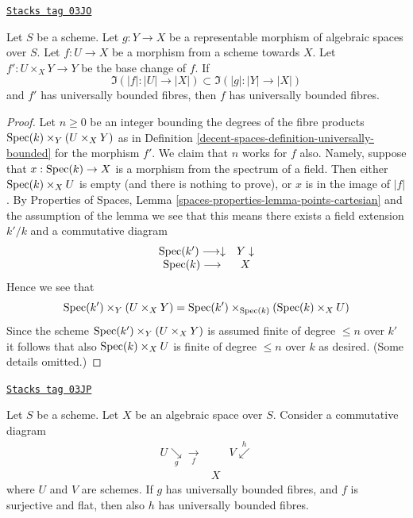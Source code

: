 \begin{lemma}
\label{decent-spaces-lemma-descent-universally-bounded}
\href{https://stacks.math.columbia.edu/tag/03JO}{\texttt{Stacks tag 03JO}}

Let $S$ be a scheme. Let $g : Y \to X$ be a representable morphism of
algebraic spaces over $S$. Let $f : U \to X$ be a morphism from a scheme
towards $X$. Let $f' : U \times_X Y \to Y$ be the base change of $f$.
If
$$
\Im(|f| : |U| \to |X|) \subset \Im(|g| : |Y| \to |X|)
$$
and $f'$ has universally bounded fibres, then $f$ has universally
bounded fibres.
\end{lemma}

\begin{proof}
Let $n \geq 0$ be an integer bounding the degrees of the fibre
products $\operatorname{Spec}(k) \times_Y (U \times_X Y)$ as in
Definition \ref{decent-spaces-definition-universally-bounded} for the morphism $f'$.
We claim that $n$ works for $f$ also. Namely, suppose that
$x : \operatorname{Spec}(k) \to X$ is a morphism from the spectrum of
a field. Then either $\operatorname{Spec}(k) \times_X U$ is empty (and there
is nothing to prove), or $x$ is in the image of $|f|$. By
Properties of Spaces,
Lemma \ref{spaces-properties-lemma-points-cartesian}
and the assumption of the lemma we see
that this means there exists a field extension $k'/k$ and a
commutative diagram
$$
\begin{array}{cc}\operatorname{Spec}(k') \longrightarrow\downarrow & Y \downarrow \\ \operatorname{Spec}(k) \longrightarrow & X\end{array}
$$
Hence we see that
$$
\operatorname{Spec}(k') \times_Y (U \times_X Y) =
\operatorname{Spec}(k') \times_{\operatorname{Spec}(k)} (\operatorname{Spec}(k) \times_X U)
$$
Since the scheme $\operatorname{Spec}(k') \times_Y (U \times_X Y)$ is assumed finite
of degree $\leq n$ over $k'$ it follows that also $\operatorname{Spec}(k) \times_X U$
is finite of degree $\leq n$ over $k$ as desired. (Some details omitted.)
\end{proof}

\begin{lemma}
\label{decent-spaces-lemma-universally-bounded-permanence}
\href{https://stacks.math.columbia.edu/tag/03JP}{\texttt{Stacks tag 03JP}}

Let $S$ be a scheme. Let $X$ be an algebraic space over $S$.
Consider a commutative diagram
$$
\begin{array}{ccc}U \underset{g}{\searrow}\underset{f}{\longrightarrow} &  & V \overset{h}{\swarrow} \\  & X & \end{array}
$$
where $U$ and $V$ are schemes. If $g$ has universally bounded fibres,
and $f$ is surjective and flat, then also $h$ has universally bounded fibres.
\end{lemma}

